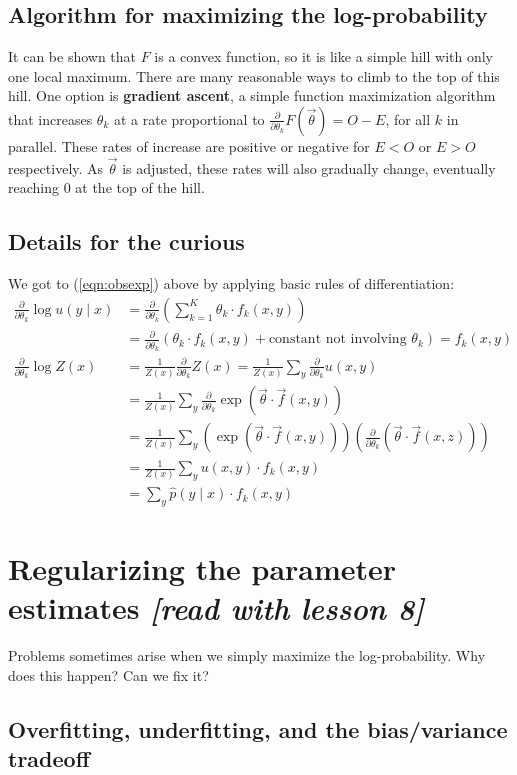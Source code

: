 \documentclass[11pt]{article}
\newcommand{\vtheta}{\vec{\theta}}
\newcommand{\ph}{\hat{p}}
\newcommand{\diffk}{\frac{\partial}{\partial \theta_k}}
\begin{document}
\subsection{Algorithm for maximizing the log-probability}

It can be shown that $F$ is a convex function, so it is like a simple
hill with only one local maximum.  There are many reasonable ways to
climb to the top of this hill.  One option is {\bf gradient ascent}, a
simple function maximization algorithm that increases $\theta_k$ at a
rate proportional to $\diffk F(\vtheta)=O-E$, for all $k$ in parallel.
These rates of increase are positive or negative for $E < O$ or $E >
O$ respectively.  As $\vtheta$ is adjusted, these rates will also
gradually change, eventually reaching 0 at the top of the hill.

\subsection{Details for the curious}

We got to (\ref{eqn:obsexp}) above by applying basic rules
of differentiation:
\begin{align}
  \diffk \log u(y \mid x) 
  &= \diffk \left( \sum_{k=1}^K \theta_k \cdot f_k(x,y) \right) \\
  & = \diffk \left( \theta_k \cdot f_k(x,y) + \textrm{constant not involving $\theta_k$} \right) = f_k(x,y)\\
%
  \diffk \log Z(x) &= \frac{1}{Z(x)} \diffk Z(x) 
  = \frac{1}{Z(x)} \sum_y \diffk u(x,y)  \\
  &= \frac{1}{Z(x)} \sum_y \diffk \exp (\vtheta \cdot \vec{f}(x,y))\\
  &= \frac{1}{Z(x)} \sum_y \left( \exp (\vtheta \cdot \vec{f}(x,y)) \right) 
  \left( \diffk (\vtheta \cdot \vec{f}(x,z)) \right) \\
  &= \frac{1}{Z(x)} \sum_y u(x,y) \cdot f_k(x,y) \\
  &= \sum_y \ph(y\mid x) \cdot f_k(x,y)
\end{align}

\section{Regularizing the parameter estimates {\em [read with lesson 8]}}

Problems sometimes arise when we simply maximize the log-probability.
Why does this happen?  Can we fix it?

\subsection{Overfitting, underfitting, and the bias/variance tradeoff} 
\end{document}
